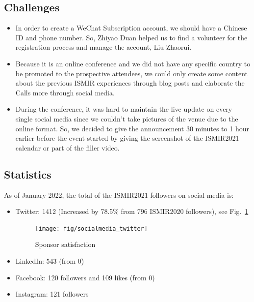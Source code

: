 \documentclass[%
10pt,								%
titlepage,						%
]
{scrartcl}
\begin{document}
    \subsection{Challenges}
        \begin{itemize}
            \item   In order to create a WeChat Subscription account, we should have a Chinese ID and phone number. So, Zhiyao Duan helped us to find a volunteer for the registration process and manage the account, Liu Zhaorui. 
            \item   Because it is an online conference and we did not have any specific country to be promoted to the prospective attendees, we could only create some content about the previous ISMIR experiences through blog posts and elaborate the Calls more through social media.
            \item   During the conference, it was hard to maintain the live update on every single social media since we couldn't take pictures of the venue due to the online format. So, we decided to give the announcement 30 minutes to 1 hour earlier before the event started by giving the screenshot of the ISMIR2021 calendar or part of the filler video.
        \end{itemize}
        
    \subsection{Statistics}
        As of January 2022, the total of the ISMIR2021 followers on social media is:
        \begin{itemize}
            \item Twitter: 1412 (Increased by 78.5\% from 796 ISMIR2020 followers), see Fig.~\ref{fig:socialmedia_twitter}
                \begin{figure}%
                    \centering
                    \texttt{[image: fig/socialmedia\_twitter]}%
                    \caption{Sponsor satisfaction}%
                    \label{fig:socialmedia_twitter}%
                \end{figure}
            \item   LinkedIn: 543  (from 0)
            \item   Facebook: 120 followers and 109 likes (from 0)
            \item   Instagram: 121 followers
        \end{itemize}
        
\end{document}
